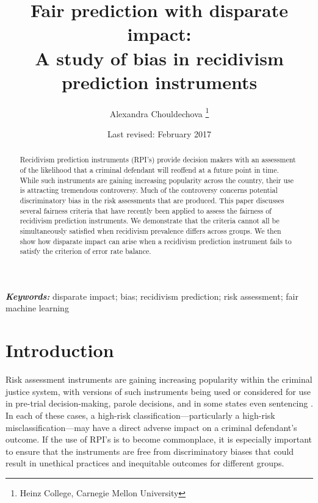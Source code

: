 \documentclass[11pt, svgnames]{article}
\title{Fair prediction with disparate impact: \\ {\Large A study of bias in recidivism prediction instruments}}
\author{Alexandra Chouldechova \thanks{Heinz College, Carnegie Mellon University}}
\date{Last revised: February 2017}
\providecommand{\keywords}[1]{\textbf{\textit{Keywords:}} #1}
\numberwithin{equation}{section}
\theoremstyle{plain}
\theoremstyle{definition}
\numberwithin{prop}{section}
\numberwithin{corollary}{section}
\begin{document}
  \maketitle
  
  
  \begin{abstract}
 Recidivism prediction instruments (RPI's) provide decision makers with an assessment of the likelihood that a criminal defendant will reoffend at a future point in time. While such instruments are gaining increasing popularity across the country, their use is attracting tremendous controversy. Much of the controversy concerns potential discriminatory bias in the risk assessments that are produced. This paper discusses several fairness criteria that have recently been applied to assess the fairness of recidivism prediction instruments.  We demonstrate that the criteria cannot all be simultaneously satisfied when recidivism prevalence differs across groups.  We then show how disparate impact can arise when a recidivism prediction instrument fails to satisfy the criterion of error rate balance. 
  \end{abstract}
  
  \keywords{disparate impact; bias; recidivism prediction; risk assessment; fair machine learning}
  
\section{Introduction} \label{sec:intro}

Risk assessment instruments are gaining increasing popularity within the criminal justice system, with versions of such instruments being used or considered for use in pre-trial decision-making, parole decisions, and in some states even sentencing \citep{ali-model-code-draft-4,blomberg2010validation, 538rpi}.  In each of these cases, a high-risk classification---particularly a high-risk misclassification---may have a direct adverse impact on a criminal defendant's outcome.   If the use of RPI's is to become commonplace, it is especially important to ensure that the instruments are free from discriminatory biases that could result in unethical practices and inequitable outcomes for different groups.
\end{document}
